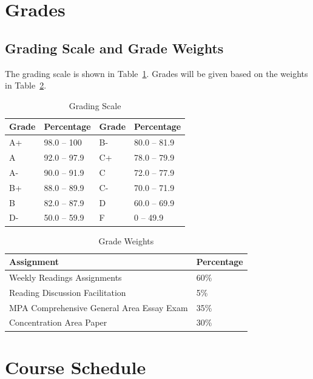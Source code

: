 \documentclass[11pt, letterpaper]{article}
\begin{document}
\section{Grades}


\subsection*{Grading Scale and Grade Weights}  

The grading scale is shown in Table~\ref{tab:grading-scale}. Grades will be given based on the weights in Table~\ref{tab:grade-weights}.

\begin{table}[h]
\centering
\caption{Grading Scale}
\begin{tabular}{llll}
\toprule
\textbf{Grade} & \textbf{Percentage} & \textbf{Grade} & \textbf{Percentage} \\
\midrule
A+ & 98.0 -- 100 & B- & 80.0 -- 81.9\\
A & 92.0 -- 97.9 & C+ & 78.0 -- 79.9\\
A- & 90.0 -- 91.9 & C & 72.0 -- 77.9\\
B+ & 88.0 -- 89.9 & C- & 70.0 -- 71.9\\
B & 82.0 -- 87.9 & D & 60.0 -- 69.9\\
D- & 50.0 -- 59.9 & F & 0 -- 49.9\\

\bottomrule
\end{tabular}
\label{tab:grading-scale}
\end{table}

\begin{table}[h!]
    \centering
    \caption{Grade Weights}
    \begin{tabular}{ll}
        \toprule
    \textbf{Assignment} & \textbf{Percentage} \\
    \midrule
    Weekly Readings Assignments & 60\% \\
    Reading Discussion Facilitation & 5\% \\
    MPA Comprehensive General Area Essay Exam & 35\% \\
    Concentration Area Paper & 30\% \\
    \bottomrule
    \end{tabular}
    \label{tab:grade-weights}
    \end{table}
    
\section{Course Schedule}
\end{document}
